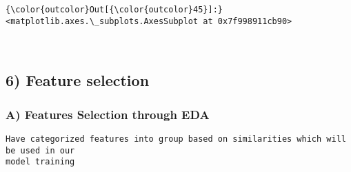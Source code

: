 \documentclass[11pt]{article}
\begin{document}
\begin{Verbatim}[commandchars=\\\{\}]
{\color{outcolor}Out[{\color{outcolor}45}]:} <matplotlib.axes.\_subplots.AxesSubplot at 0x7f998911cb90>
\end{Verbatim}
            
    \begin{center}
    \end{center}
    { \hspace*{\fill} \\}
    
    \subsection{6) Feature selection}\label{feature-selection}

    \subsubsection{A) Features Selection through
EDA}\label{a-features-selection-through-eda}

\begin{verbatim}
Have categorized features into group based on similarities which will be used in our 
model training
\end{verbatim}
\end{document}
